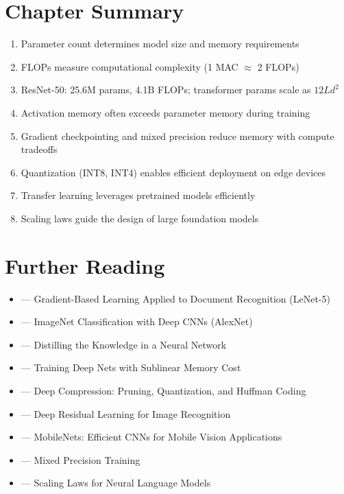 \section{Chapter Summary}

\begin{enumerate}
    \item Parameter count determines model size and memory requirements
    \item FLOPs measure computational complexity (1 MAC $\approx$ 2 FLOPs)
    \item ResNet-50: 25.6M params, 4.1B FLOPs; transformer params scale as $12Ld^2$
    \item Activation memory often exceeds parameter memory during training
    \item Gradient checkpointing and mixed precision reduce memory with compute tradeoffs
    \item Quantization (INT8, INT4) enables efficient deployment on edge devices
    \item Transfer learning leverages pretrained models efficiently
    \item Scaling laws guide the design of large foundation models
\end{enumerate}

\section{Further Reading}

\begin{itemize}
    \item \cite{lecun1998gradient} --- Gradient-Based Learning Applied to Document Recognition (LeNet-5)
    \item \cite{krizhevsky2012imagenet} --- ImageNet Classification with Deep CNNs (AlexNet)
    \item \cite{hinton2015distilling} --- Distilling the Knowledge in a Neural Network
    \item \cite{chen2016training} --- Training Deep Nets with Sublinear Memory Cost
    \item \cite{han2015deep} --- Deep Compression: Pruning, Quantization, and Huffman Coding
    \item \cite{he2016deep} --- Deep Residual Learning for Image Recognition
    \item \cite{howard2017mobilenets} --- MobileNets: Efficient CNNs for Mobile Vision Applications
    \item \cite{micikevicius2018mixed} --- Mixed Precision Training
    \item \cite{kaplan2020scaling} --- Scaling Laws for Neural Language Models
\end{itemize}

